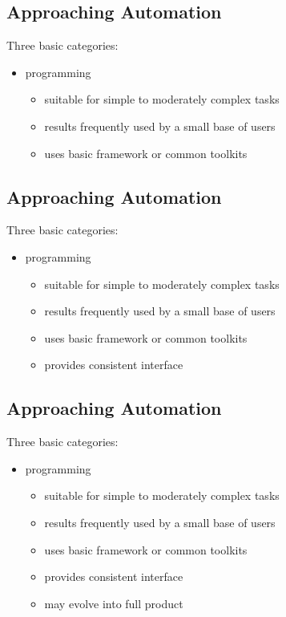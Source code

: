 \documentclass[xga]{xdvislides}
\begin{document}
\subsection{Approaching Automation}
Three basic categories:
\\

\begin{itemize}
	\item programming
		\begin{itemize}
			\item suitable for simple to moderately complex tasks
			\item results frequently used by a small base of users
			\item uses basic framework or common toolkits
		\end{itemize}
\end{itemize}

\subsection{Approaching Automation}
Three basic categories:
\\

\begin{itemize}
	\item programming
		\begin{itemize}
			\item suitable for simple to moderately complex tasks
			\item results frequently used by a small base of users
			\item uses basic framework or common toolkits
			\item provides consistent interface
		\end{itemize}
\end{itemize}

\subsection{Approaching Automation}
Three basic categories:
\\

\begin{itemize}
	\item programming
		\begin{itemize}
			\item suitable for simple to moderately complex tasks
			\item results frequently used by a small base of users
			\item uses basic framework or common toolkits
			\item provides consistent interface
			\item may evolve into full product
		\end{itemize}
\end{itemize}
\end{document}

